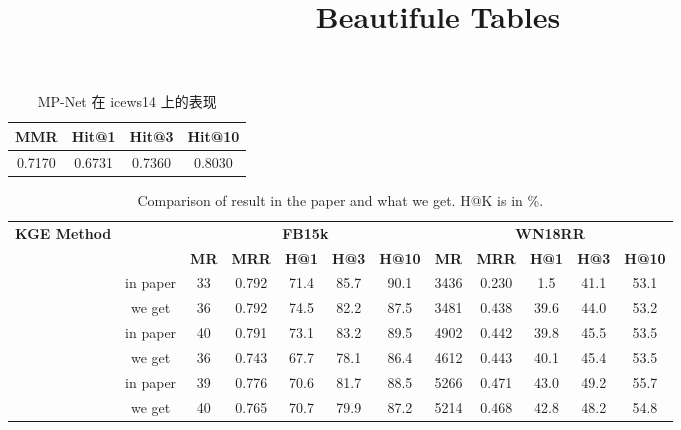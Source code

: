 \documentclass{article}
\title{Beautifule Tables}
\begin{document}
	
	\maketitle


	

	\begin{table}[htbp]
		\centering
		\caption{MP-Net 在 icews14 上的表现}
		\begin{tabular}{cccc}
			\toprule  %
			MMR&Hit@1&Hit@3&Hit@10 \\ 
			\midrule  %
			0.7170&0.6731&0.7360&0.8030 \\
			\bottomrule  %
		\end{tabular}
	\end{table}

	
	\begin{table}[bht]
		\caption{Comparison of result in the paper and what we get. H@K is in \%.}
		\label{tab::results-kge}
		\begin{center}
			\scalebox{0.75}
			{
				\begin{tabular}{c c |c c c c c | c c c c c}\hline
					\multirow{2}{*}{\textbf{KGE Method}}	& \multirow{2}{*}{\textbf{}} & \multicolumn{5}{c|}{\textbf{FB15k}} & \multicolumn{5}{c}{\textbf{WN18RR}}	\\
					& & \textbf{MR} & \textbf{MRR} & \textbf{H@1} & \textbf{H@3} & \textbf{H@10} & \textbf{MR} & \textbf{MRR} & \textbf{H@1} & \textbf{H@3} & \textbf{H@10} \\ 
					\hline
					& in paper & 33 & 0.792 & 71.4 & 85.7 & 90.1 & 3436 & 0.230 & 1.5 & 41.1 & 53.1 \\
					\rowcolor{green!60}  %
					\multirow{-2}{*}{\textbf{TransE}}  %
					& we get & 36 & 0.792 & 74.5 & 82.2 & 87.5 & 3481 & 0.438 & 39.6 & 44.0 & 53.2 \\
					\hline
					& in paper & 40 & 0.791 & 73.1 & 83.2 & 89.5 & 4902 & 0.442 & 39.8 & 45.5 & 53.5 \\
					\rowcolor{green!20}
					\multirow{-2}{*}{\textbf{DistMult}} 
					& we get & 36 & 0.743 & 67.7 & 78.1 & 86.4 & 4612 & 0.443 & 40.1 & 45.4 & 53.5 \\
					\hline
					& in paper & 39 & 0.776 & 70.6 & 81.7 & 88.5 & 5266 & 0.471 & 43.0 & 49.2 & 55.7 \\
					\rowcolor{green}
					\multirow{-2}{*}{\textbf{ComplEx}} 
					& we get & 40 & 0.765 & 70.7 & 79.9 & 87.2 & 5214 & 0.468 & 42.8 & 48.2 & 54.8 \\
					\hline
				\end{tabular}
			}
		\end{center}
		\vspace{-0.15cm}
	\end{table}
\end{document}
